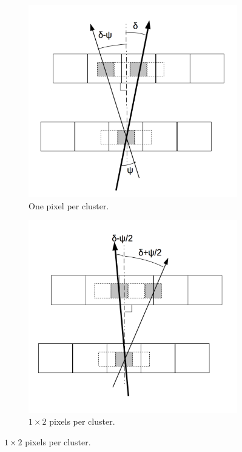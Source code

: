    \begin{figure}[!h]
     \centering
      \begin{subfigure}[t]{0.45\textwidth}
         \centering
         \includegraphics[width = \textwidth]{Pictures/deformation/cluster1x1_jerome.png}
         \caption{One pixel per cluster.}
         \label{fig:1x1cluster}
      \end{subfigure}
      \quad
      \begin{subfigure}[t]{0.45\textwidth}
        \centering
        \includegraphics[width = \textwidth]{Pictures/deformation/cluster1x2_jerome.png}
        \caption{$1 \times 2$ pixels per cluster.}
        \label{fig:1x2clusters}
      \end{subfigure}
      

\end{figure}
